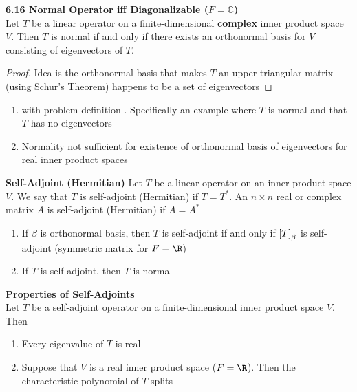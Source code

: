 \documentclass[11pt]{article}
\begin{document}
\begin{theorem*}
    \textbf{6.16 Normal Operator iff Diagonalizable ($F=\mathbb{C}$)} \\
    Let $T$ be a linear operator on a finite-dimensional \textbf{complex} inner product space $V$. Then $T$ is normal if and only if there exists an orthonormal basis for $V$ consisting of eigenvectors of $T$.
    \begin{proof}
        Idea is the orthonormal basis that makes $T$ an upper triangular matrix (using Schur's Theorem) happens to be a set of eigenvectors
    \end{proof}
    \begin{enumerate}
        \item {} with problem definition . Specifically an example where $T$ is normal and that $T$ has no eigenvectors
        \item Normality not sufficient for existence of orthonormal basis of eigenvectors for real inner product spaces 
    \end{enumerate}
\end{theorem*}


\begin{defn*}
    \textbf{Self-Adjoint (Hermitian)} Let $T$ be a linear operator on an inner product space $V$. We say that $T$ is self-adjoint (Hermitian) if $T = T^*$. An $n\times n$ real or complex matrix $A$ is self-adjoint (Hermitian) if $A=A^*$
    \begin{enumerate}
        \item If $\beta$ is orthonormal basis, then $T$ is self-adjoint if and only if $\left[ T \right]_{\beta}$ is self-adjoint (symmetric matrix for $F=\R$)
        \item If $T$ is self-adjoint, then $T$ is normal
    \end{enumerate}
\end{defn*}

\begin{lemma*}
    \textbf{Properties of Self-Adjoints} \\ 
    Let $T$ be a self-adjoint operator on a finite-dimensional inner product space $V$. Then 
    \begin{enumerate}
        \item Every eigenvalue of $T$ is real 
        \item Suppose that $V$ is a real inner product space ($F=\R$). Then the characteristic polynomial of $T$ splits
    \end{enumerate}
\end{lemma*}
\end{document}
